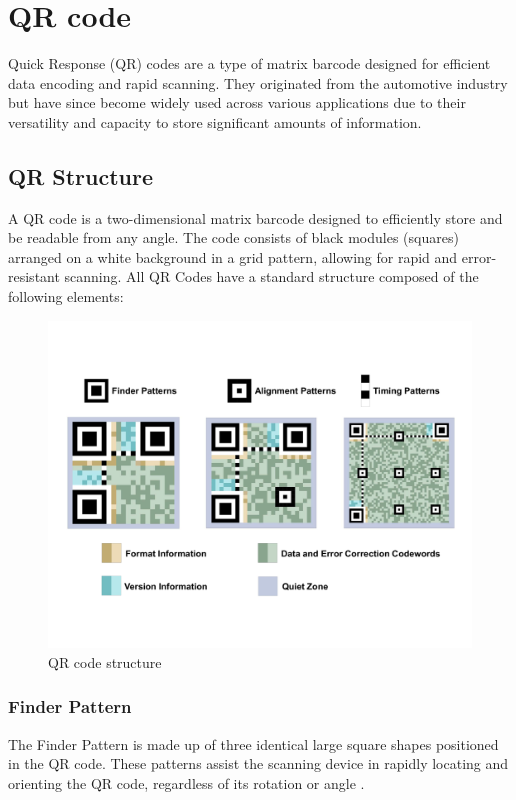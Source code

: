 \section{QR code}
Quick Response (QR) codes are a type of matrix barcode designed for efficient data encoding and rapid scanning. They originated from the automotive industry but have since become widely used across various applications due to their versatility and capacity to store significant amounts of information.

\subsection{QR Structure}
A QR code is a two-dimensional matrix barcode designed to efficiently store and be readable from any angle. The code consists of black modules (squares) arranged on a white background in a grid pattern, allowing for rapid and error-resistant scanning. All QR Codes have a standard structure composed of the following elements:

\begin{figure}[h] %
	\centering
	\includegraphics[width=15cm]{assets/ch2/qr_code_structure}
	\caption{QR code structure}
	\label{QR_code_structure}
\end{figure}

\subsubsection*{Finder Pattern}
The Finder Pattern is made up of three identical large square shapes positioned in the QR code. These patterns assist the scanning device in rapidly locating and orienting the QR code, regardless of its rotation or angle \cite{Tiwari2016}.

